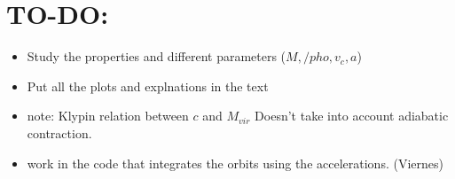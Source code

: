 \documentclass[a4paper, 12pt]{article} %
\begin{document}
\section{TO-DO:}

\begin{itemize}

\item Study the properties and different parameters ($M, /pho, v_c, a$)
\item Put all the plots and explnations in the text
\item note: Klypin relation between $c$ and $M_{vir}$ Doesn't take into 
account adiabatic contraction. 

\item work in the code that integrates the orbits using the accelerations. (Viernes)

\end{itemize}



\end{document}
